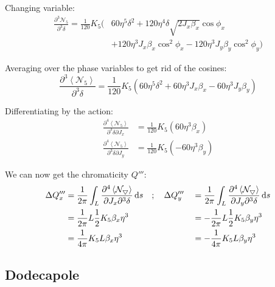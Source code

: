 Changing variable: \begin{equation}\begin{aligned}
\frac{\partial^3 \mathcal{N_5}}{\partial^3 \delta} = \frac{1}{120} K_5 \biggl(& 60\eta^5\delta^2 + 120 \eta^4\delta \sqrt{2J_x\beta_x}\cos\phi_x\\
    &+ 120\eta^3 J_x\beta_x\cos^2\phi_x - 120\eta^3 J_y\beta_y\cos^2\phi_y\biggr)
\end{aligned}\end{equation}

Averaging over the phase variables to get rid of the cosines:
\begin{equation}\frac{\partial^3 \left<\mathcal{N_5}\right>}{\partial^3 \delta} = \frac{1}{120} K_5 \left( 60\eta^5\delta^2
  + 60\eta^3 J_x\beta_x- 60\eta^3 J_y\beta_y\right)\end{equation}

Differentiating by the action: \begin{equation}\begin{aligned}
\frac{\partial^4 \left<\mathcal{N}_5\right>}{\partial^3 \delta \partial J_x} &= \frac{1}{120} K_5 \left( 60 \eta^3 \beta_x \right) \\
\frac{\partial^4 \left<\mathcal{N}_5\right>}{\partial^3 \delta \partial J_y} &= \frac{1}{120} K_5 \left(- 60 \eta^3 \beta_y \right)
\end{aligned}\end{equation}

We can now get the chromaticity \(Q'''\):
\begin{equation}\begin{aligned}
\Delta Q'''_x &= \frac{1}{2\pi} \int_L \frac{\partial^4 \left< \mathcal{N_5} \right>}{\partial J_x \partial^3 \delta} \mathop{}\!\mathrm{d} s \quad; \quad \Delta Q'''_y &&= \frac{1}{2\pi} \int_L \frac{\partial^4 \left< \mathcal{N_5} \right>}{\partial J_y \partial^3 \delta} \mathop{}\!\mathrm{d} s \\
&= \frac{1}{2 \pi} L \frac{1}{2} K_5 \beta_x \eta^3  &&= - \frac{1}{2 \pi} L \frac{1}{2} K_5 \beta_y \eta^3 \\
&= \frac{1}{4 \pi}  K_5 L \beta_x \eta^3 &&= - \frac{1}{4 \pi}  K_5 L \beta_y \eta^3
\end{aligned}\end{equation}

\hypertarget{dodecapole-1}{%
\subsection{Dodecapole}\label{dodecapole-1}}


